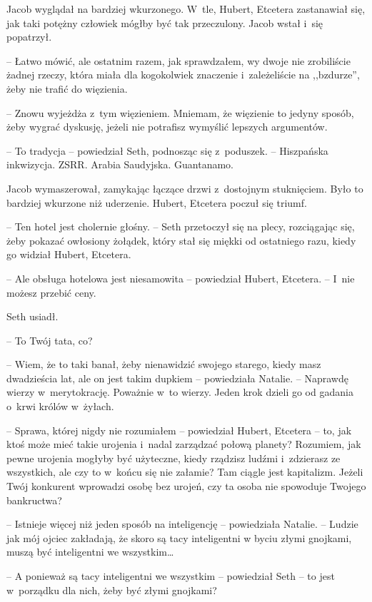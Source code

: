 \documentclass[oneside,polish,11pt,sfheadings]{mwbk}
\begin{document}
Jacob wyglądał na bardziej wkurzonego. W~tle, Hubert, Etcetera
zastanawiał się, jak taki potężny człowiek mógłby być tak przeczulony.
Jacob wstał i~się popatrzył. 

-- Łatwo mówić, ale ostatnim razem, jak
sprawdzałem, wy dwoje nie zrobiliście żadnej rzeczy, która miała dla
kogokolwiek znaczenie i~zależeliście na ,,bzdurze'', żeby nie trafić do
więzienia.

-- Znowu wyjeżdża z~tym więzieniem. Mniemam, że więzienie to jedyny
sposób, żeby wygrać dyskusję, jeżeli nie potrafisz wymyślić lepszych
argumentów.

-- To tradycja -- powiedział Seth, podnosząc się z~poduszek. -- Hiszpańska
inkwizycja. ZSRR. Arabia Saudyjska. Guantanamo.

Jacob wymaszerował, zamykając łączące drzwi z~dostojnym stuknięciem.
Było to bardziej wkurzone niż uderzenie. Hubert, Etcetera poczuł się
triumf.

-- Ten hotel jest cholernie głośny. -- Seth przetoczył się na plecy,
rozciągając się, żeby pokazać owłosiony żołądek, który stał się miękki
od ostatniego razu, kiedy go widział Hubert, Etcetera.

-- Ale obsługa hotelowa jest niesamowita -- powiedział Hubert, Etcetera. -- I~nie możesz przebić ceny.

Seth usiadł. 

-- To Twój tata, co?

-- Wiem, że to taki banał, żeby nienawidzić swojego starego, kiedy masz
dwadzieścia lat, ale on jest takim dupkiem -- powiedziała Natalie. -- Naprawdę wierzy w~merytokrację. Poważnie w~to wierzy. Jeden krok dzieli
go od gadania o~krwi królów w~żyłach.

-- Sprawa, której nigdy nie rozumiałem -- powiedział Hubert, Etcetera -- to, jak ktoś może mieć takie urojenia i~nadal zarządzać połową planety?
Rozumiem, jak pewne urojenia mogłyby być użyteczne, kiedy rządzisz
ludźmi i~zdzierasz ze wszystkich, ale czy to w~końcu się nie załamie?
Tam ciągle jest kapitalizm. Jeżeli Twój konkurent wprowadzi osobę bez
urojeń, czy ta osoba nie spowoduje Twojego bankructwa?

-- Istnieje więcej niż jeden sposób na inteligencję -- powiedziała
Natalie. -- Ludzie jak mój ojciec zakładają, że skoro są tacy inteligentni
w byciu złymi gnojkami, muszą być inteligentni we wszystkim\ldots 

-- A ponieważ są tacy inteligentni we wszystkim -- powiedział Seth -- to
jest w~porządku dla nich, żeby być złymi gnojkami?
\end{document}
